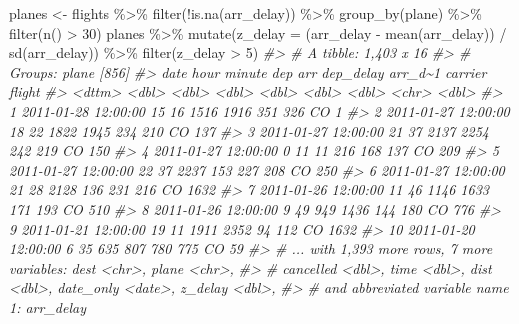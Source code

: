 \documentclass[
]{book}
\newenvironment{Shaded}{\begin{snugshade}}{\end{snugshade}}
\newcommand{\AttributeTok}[1]{\textcolor[rgb]{0.77,0.63,0.00}{#1}}
\newcommand{\CommentTok}[1]{\textcolor[rgb]{0.56,0.35,0.01}{\textit{#1}}}
\newcommand{\DecValTok}[1]{\textcolor[rgb]{0.00,0.00,0.81}{#1}}
\newcommand{\FunctionTok}[1]{\textcolor[rgb]{0.00,0.00,0.00}{#1}}
\newcommand{\NormalTok}[1]{#1}
\newcommand{\OtherTok}[1]{\textcolor[rgb]{0.56,0.35,0.01}{#1}}
\newcommand{\SpecialCharTok}[1]{\textcolor[rgb]{0.00,0.00,0.00}{#1}}
\begin{document}
\begin{Shaded}
\begin{Highlighting}[]
\NormalTok{planes }\OtherTok{\textless{}{-}}\NormalTok{ flights }\SpecialCharTok{\%\textgreater{}\%}
  \FunctionTok{filter}\NormalTok{(}\SpecialCharTok{!}\FunctionTok{is.na}\NormalTok{(arr\_delay)) }\SpecialCharTok{\%\textgreater{}\%}
  \FunctionTok{group\_by}\NormalTok{(plane) }\SpecialCharTok{\%\textgreater{}\%}
  \FunctionTok{filter}\NormalTok{(}\FunctionTok{n}\NormalTok{() }\SpecialCharTok{\textgreater{}} \DecValTok{30}\NormalTok{)}
\NormalTok{planes }\SpecialCharTok{\%\textgreater{}\%}
  \FunctionTok{mutate}\NormalTok{(}\AttributeTok{z\_delay =}
\NormalTok{    (arr\_delay }\SpecialCharTok{{-}} \FunctionTok{mean}\NormalTok{(arr\_delay)) }\SpecialCharTok{/} \FunctionTok{sd}\NormalTok{(arr\_delay)) }\SpecialCharTok{\%\textgreater{}\%}
  \FunctionTok{filter}\NormalTok{(z\_delay }\SpecialCharTok{\textgreater{}} \DecValTok{5}\NormalTok{)}
\CommentTok{\#\textgreater{} \# A tibble: 1,403 x 16}
\CommentTok{\#\textgreater{} \# Groups:   plane [856]}
\CommentTok{\#\textgreater{}    date                 hour minute   dep   arr dep\_delay arr\_d\textasciitilde{}1 carrier flight}
\CommentTok{\#\textgreater{}    \textless{}dttm\textgreater{}              \textless{}dbl\textgreater{}  \textless{}dbl\textgreater{} \textless{}dbl\textgreater{} \textless{}dbl\textgreater{}     \textless{}dbl\textgreater{}   \textless{}dbl\textgreater{} \textless{}chr\textgreater{}    \textless{}dbl\textgreater{}}
\CommentTok{\#\textgreater{}  1 2011{-}01{-}28 12:00:00    15     16  1516  1916       351     326 CO           1}
\CommentTok{\#\textgreater{}  2 2011{-}01{-}27 12:00:00    18     22  1822  1945       234     210 CO         137}
\CommentTok{\#\textgreater{}  3 2011{-}01{-}27 12:00:00    21     37  2137  2254       242     219 CO         150}
\CommentTok{\#\textgreater{}  4 2011{-}01{-}27 12:00:00     0     11    11   216       168     137 CO         209}
\CommentTok{\#\textgreater{}  5 2011{-}01{-}27 12:00:00    22     37  2237   153       227     208 CO         250}
\CommentTok{\#\textgreater{}  6 2011{-}01{-}27 12:00:00    21     28  2128   136       231     216 CO        1632}
\CommentTok{\#\textgreater{}  7 2011{-}01{-}26 12:00:00    11     46  1146  1633       171     193 CO         510}
\CommentTok{\#\textgreater{}  8 2011{-}01{-}26 12:00:00     9     49   949  1436       144     180 CO         776}
\CommentTok{\#\textgreater{}  9 2011{-}01{-}21 12:00:00    19     11  1911  2352        94     112 CO        1632}
\CommentTok{\#\textgreater{} 10 2011{-}01{-}20 12:00:00     6     35   635   807       780     775 CO          59}
\CommentTok{\#\textgreater{} \# ... with 1,393 more rows, 7 more variables: dest \textless{}chr\textgreater{}, plane \textless{}chr\textgreater{},}
\CommentTok{\#\textgreater{} \#   cancelled \textless{}dbl\textgreater{}, time \textless{}dbl\textgreater{}, dist \textless{}dbl\textgreater{}, date\_only \textless{}date\textgreater{}, z\_delay \textless{}dbl\textgreater{},}
\CommentTok{\#\textgreater{} \#   and abbreviated variable name 1: arr\_delay}
\end{Highlighting}
\end{Shaded}
\end{document}
